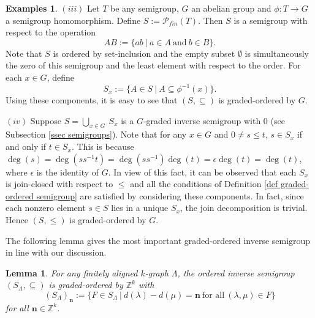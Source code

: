 \documentclass[a4paper,reqno,11pt]{amsart}
\numberwithin{equation}{section}
\newtheorem{lem}[thm]{Lemma}
\theoremstyle{definition}
\newtheorem{examples}[thm]{Examples}
\theoremstyle{remark}
\newcommand{\N}{\mathbf{n}}
\begin{document}
\begin{examples}
$(iii)$ Let $T$ be any semigroup, $G$ an abelian group and $\phi:T\longrightarrow G$ a semigroup homomorphism. Define $S:=\mathcal{P}_{fin}(T)$. Then $S$ is a semigroup with respect to the operation \[AB:=\{ab~|~a\in A~\text{and}~b\in B\}.\] Note that $S$ is ordered by set-inclusion and the empty subset $\emptyset$ is simultaneously the zero of this semigroup and the least element with respect to the order. For each $x\in G$, define \[S_x:=\{A\in S~|~A\subseteq \phi^{-1}(x)\}.\] Using these components, it is easy to see that $(S,\subseteq)$ is graded-ordered by $G$. 

$(iv)$ Suppose $S=\displaystyle{\bigcup_{x\in G}}~S_x$ is a $G$-graded inverse semigroup with $0$ (see Subsection \ref{ssec semigroups}). Note that for any $x\in G$ and $0\neq s\le t$, $s\in S_x$ if and only if $t\in S_x$. This is because $\deg(s)=\deg(ss^{-1}t)=\deg(ss^{-1})\deg(t)=\epsilon\deg(t)=\deg(t)$, where $\epsilon$ is the identity of $G$. In view of this fact, it can be observed that each $S_x$ is join-closed with respect to $\le$ and all the conditions of Definition \ref{def graded-ordered semigroup} are satisfied by considering these components. In fact, since each nonzero element $s\in S$ lies in a unique $S_x$, the join decomposition is trivial. Hence $(S,\le)$ is graded-ordered by $G$. 
\end{examples}
The following lemma gives the most important graded-ordered inverse semigroup in line with our discussion.
\begin{lem}\label{lem S_Lambda is graded-ordered}
For any finitely aligned $k$-graph $\Lambda$, the ordered inverse semigroup $(S_\Lambda,\subseteq)$ is graded-ordered by $\mathbb{Z}^k$ with \[(S_\Lambda)_\N:=\{F\in S_\Lambda~|~d(\lambda)-d(\mu)=\N~\text{for all}~(\lambda,\mu)\in F\}\] for all $\N\in \mathbb{Z}^k$.   
\end{lem}
\end{document}
